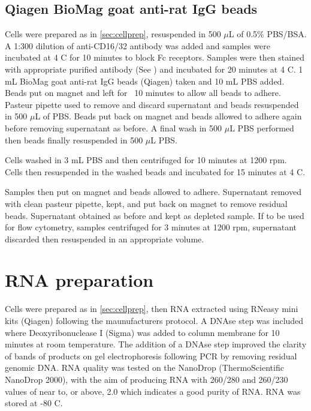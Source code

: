 \subsection{Qiagen BioMag goat anti-rat IgG beads}

Cells were prepared as in \cref{sec:cellprep}, resuspended in 500 $\mu$L of 0.5\% PBS/BSA.
A 1:300 dilution of anti-CD16/32 antibody was added and samples were incubated at 4 \textdegree C for 10 minutes to block Fc receptors.
Samples were then stained with appropriate purified antibody (See ) and incubated for 20 minutes at 4 \textdegree C.
1 mL BioMag goat anti-rat IgG beads (Qiagen) taken and 10 mL PBS added.
Beads put on magnet and left for ~10 minutes to allow all beads to adhere.
Pasteur pipette used to remove and discard supernatant and beads resuspended in 500 $\mu$L of PBS.
Beads put back on magnet and beads allowed to adhere again before removing supernatant as before.
A final wash in 500 $\mu$L PBS performed then beads finally resuspended in 500 $\mu$L PBS.

Cells washed in 3 mL PBS and then centrifuged for 10 minutes at 1200 rpm.
Cells then resuspended in the washed beads and incubated for 15 minutes at 4 \textdegree C.

Samples then put on magnet and beads allowed to adhere.
Supernatant removed with clean pasteur pipette, kept, and put back on magnet to remove residual beads.
Supernatant obtained as before and kept as depleted sample.
If to be used for flow cytometry, samples centrifuged for 3 minutes at 1200 rpm, supernatant discarded then resuspended in an appropriate volume.

\section{RNA preparation}

Cells were prepared as in \cref{sec:cellprep}, then RNA extracted using RNeasy mini kits (Qiagen) following the maunufacturers protocol.
A DNAse step was included where Deoxyribonuclease I (Sigma) was added to column membrane for 10 minutes at room temperature.
The addition of a DNAse step improved the clarity of bands of products on gel electrophoresis following PCR by removing residual genomic DNA.
RNA quality was tested on the NanoDrop (ThermoScientific NanoDrop 2000), with the aim of producing RNA with 260/280 and 260/230 values of near to, or above, 2.0 which indicates a good purity of RNA.
RNA was stored at -80 \textdegree C.


